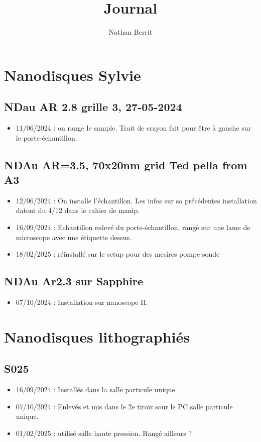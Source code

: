 \documentclass{article}
\title{Journal} %
\author{Nathan Berrit}
\begin{document}
\maketitle %



\section{Nanodisques Sylvie}

\subsection*{NDau AR 2.8 grille 3, 27-05-2024}
\begin{itemize}
    \item 11/06/2024 : on range le sample. Trait de crayon fait pour être à gauche sur le porte-échantillon.
\end{itemize}


\subsection*{NDAu AR=3.5, 70x20nm grid Ted pella from A3}
\begin{itemize}
    \item 12/06/2024 : On installe l'échantillon. Les infos sur sa précédentes installation datent du 4/12 dans le cahier de manip.
    \item 16/09/2024 : Echantillon enlevé du porte-échantillon, rangé sur une lame de microscope avec une étiquette dessus.
    \item 18/02/2025 : réinstallé sur le setup pour des mesires pompe-sonde
\end{itemize}

\subsection*{NDAu Ar2.3 sur Sapphire}
\begin{itemize}
    \item 07/10/2024 : Installation sur nanoscope II.
\end{itemize}


\section{Nanodisques lithographiés}
\subsection*{S025}
\begin{itemize}
    \item 16/09/2024 : Installés dans la salle particule unique.
    \item 07/10/2024 : Enlevés et mis dans le 2e tiroir sour le PC salle particule unique.
    \item 01/02/2025 : utilisé salle haute pression. Rangé ailleurs ?
\end{itemize}
\end{document}

